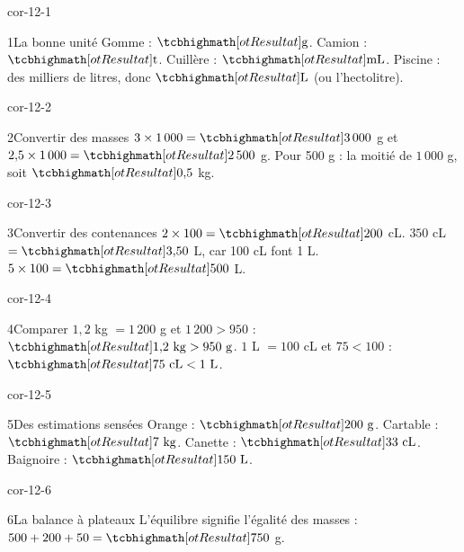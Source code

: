 \clearpage\pagestyle{otMain}\setlength{\otBlocEspacement}{2.5mm}\fontsize{11}{15}\selectfont{}
\begin{blocLivre}{cor-12-1}\begin{corrige}{1}{La bonne unité}
Gomme : $\res{\text g}$. Camion : $\res{\text t}$. Cuillère : $\res{\text{mL}}$. Piscine : des milliers de litres, donc $\res{\text L}$ (ou l’hectolitre).
\end{corrige}\end{blocLivre}
\begin{blocLivre}{cor-12-2}\begin{corrige}{2}{Convertir des masses}
$3\times1\,000=\res{3\,000}$ g et $2{,}5\times1\,000=\res{2\,500}$ g. Pour 500 g : la moitié de $1\,000$ g, soit $\res{0{,}5}$ kg.
\end{corrige}\end{blocLivre}
\begin{blocLivre}{cor-12-3}\begin{corrige}{3}{Convertir des contenances}
$2\times100=\res{200}$ cL. $350$ cL $=\res{3{,}50}$ L, car 100 cL font 1 L. $5\times100=\res{500}$ L.
\end{corrige}\end{blocLivre}
\begin{blocLivre}{cor-12-4}\begin{corrige}{4}{Comparer}
$1{,}2$ kg $=1\,200$ g et $1\,200>950$ : $\res{1{,}2\ \mathrm{kg}>950\ \mathrm g}$. $1$ L $=100$ cL et $75<100$ : $\res{75\ \mathrm{cL}<1\ \mathrm L}$.
\end{corrige}\end{blocLivre}
\begin{blocLivre}{cor-12-5}\begin{corrige}{5}{Des estimations sensées}
Orange : $\res{200\ \mathrm g}$. Cartable : $\res{7\ \mathrm{kg}}$. Canette : $\res{33\ \mathrm{cL}}$. Baignoire : $\res{150\ \mathrm L}$.
\end{corrige}\end{blocLivre}
\begin{blocLivre}{cor-12-6}\begin{corrige}{6}{La balance à plateaux}
L’équilibre signifie l’égalité des masses : $500+200+50=\res{750}$ g.
\label{fig-cor-12-6}
\end{corrige}\end{blocLivre}
